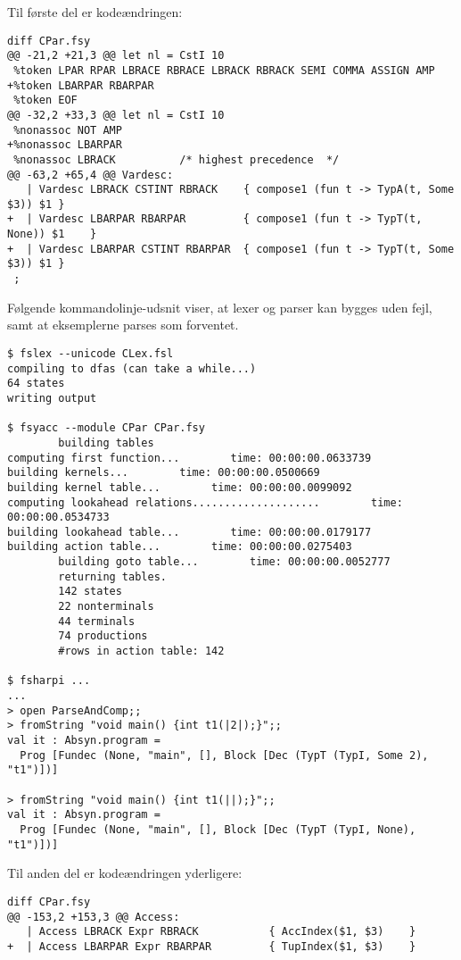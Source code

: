 Til første del er kodeændringen:

\begin{verbatim}
diff CPar.fsy
@@ -21,2 +21,3 @@ let nl = CstI 10
 %token LPAR RPAR LBRACE RBRACE LBRACK RBRACK SEMI COMMA ASSIGN AMP
+%token LBARPAR RBARPAR
 %token EOF
@@ -32,2 +33,3 @@ let nl = CstI 10
 %nonassoc NOT AMP 
+%nonassoc LBARPAR
 %nonassoc LBRACK          /* highest precedence  */
@@ -63,2 +65,4 @@ Vardesc:
   | Vardesc LBRACK CSTINT RBRACK    { compose1 (fun t -> TypA(t, Some $3)) $1 }
+  | Vardesc LBARPAR RBARPAR         { compose1 (fun t -> TypT(t, None)) $1    }
+  | Vardesc LBARPAR CSTINT RBARPAR  { compose1 (fun t -> TypT(t, Some $3)) $1 }
 ;
\end{verbatim}

Følgende kommandolinje-udsnit viser, at lexer og parser kan bygges uden fejl, samt at eksemplerne parses som forventet.

\begin{verbatim}
$ fslex --unicode CLex.fsl
compiling to dfas (can take a while...)
64 states
writing output

$ fsyacc --module CPar CPar.fsy
        building tables
computing first function...        time: 00:00:00.0633739
building kernels...        time: 00:00:00.0500669
building kernel table...        time: 00:00:00.0099092
computing lookahead relations....................        time: 00:00:00.0534733
building lookahead table...        time: 00:00:00.0179177
building action table...        time: 00:00:00.0275403
        building goto table...        time: 00:00:00.0052777
        returning tables.
        142 states
        22 nonterminals
        44 terminals
        74 productions
        #rows in action table: 142

$ fsharpi ...
...
> open ParseAndComp;;
> fromString "void main() {int t1(|2|);}";;
val it : Absyn.program =
  Prog [Fundec (None, "main", [], Block [Dec (TypT (TypI, Some 2), "t1")])]

> fromString "void main() {int t1(||);}";;
val it : Absyn.program =
  Prog [Fundec (None, "main", [], Block [Dec (TypT (TypI, None), "t1")])]
\end{verbatim}

Til anden del er kodeændringen yderligere:

\begin{verbatim}
diff CPar.fsy
@@ -153,2 +153,3 @@ Access:
   | Access LBRACK Expr RBRACK           { AccIndex($1, $3)    }   
+  | Access LBARPAR Expr RBARPAR         { TupIndex($1, $3)    }
\end{verbatim}

